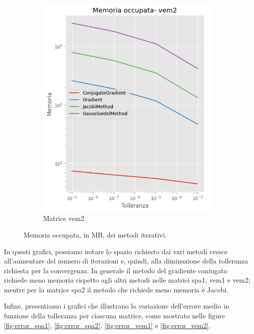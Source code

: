 \begin{figure}[!ht]
\begin{subfigure}{0.45\textwidth}
        \includegraphics[width=\textwidth]{./../report/Progetto_1_bis/img/mem_vem2.png}
        \caption{Matrice vem2}
        \label{fig:mem_vem2}
    \end{subfigure}
    \caption{Memoria occupata, in MB, dei metodi iterativi.}
    \label{fig:memory}
\end{figure}

In questi grafici, possiamo notare lo spazio richiesto dai vari metodi cresce
all'aumentare del numero di iterazioni e, quindi, alla diminuzione della tolleranza
richiesta per la convergenza. In generale il metodo del gradiente coniugato richiede
meno memoria rispetto agli altri metodi nelle matrici spa1, vem1 e vem2; mentre per
la matrice spa2 il metodo che richiede meno memoria è Jacobi.

Infine, presentiamo i grafici che illustrano la variazione dell'errore medio in
funzione della tolleranza per ciascuna matrice, come mostrato nelle figure \ref{fig:error_spa1},
\ref{fig:error_spa2}, \ref{fig:error_vem1} e \ref{fig:error_vem2}.

